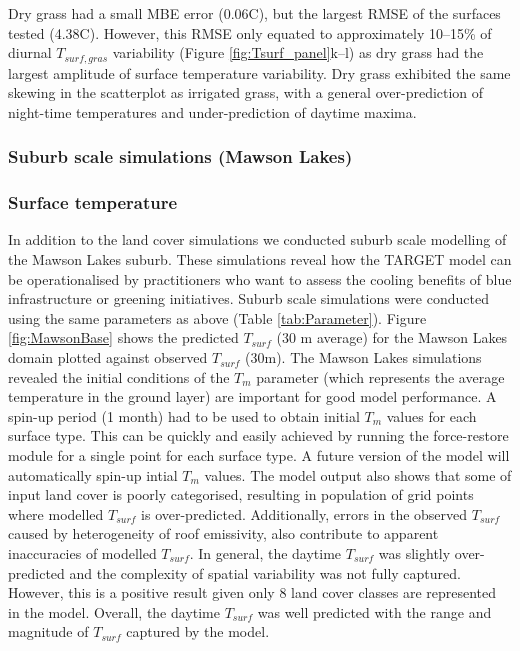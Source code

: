 \documentclass[gmd, manuscript]{copernicus}
\begin{document}
Dry grass had a small MBE error (0.06\degree C), but the largest RMSE of the surfaces tested (4.38\degree C). However, this RMSE only equated to approximately 10--15\% of diurnal $T_{surf,gras}$ variability (Figure \ref{fig:Tsurf_panel}k--l) as dry grass had the largest amplitude of surface temperature variability. Dry grass exhibited the same skewing in the scatterplot as irrigated grass, with a general over-prediction of night-time temperatures and under-prediction of daytime maxima. 





\subsubsection{Suburb scale simulations (Mawson Lakes)}\label{sec:suburbresult} 
\subsubsection*{Surface temperature}\label{sec:surftempresult} 



In addition to the land cover simulations we conducted suburb scale modelling of the Mawson Lakes suburb. These simulations reveal how the TARGET model can be operationalised by practitioners who want to assess the cooling benefits of blue infrastructure or greening initiatives. Suburb scale simulations were conducted using the same parameters as above (Table \ref{tab:Parameter}). Figure \ref{fig:MawsonBase} shows the predicted $T_{surf}$ (30 m average) for the Mawson Lakes domain plotted against observed $T_{surf}$ (30m). The Mawson Lakes simulations revealed the initial conditions of the \ensuremath{T_{m}} parameter (which represents the average temperature in the ground layer) are  important for good model performance. A spin-up period (1 month) had to be used to obtain initial \ensuremath{T_{m}} values for each surface type. This can be quickly and easily achieved by running the force-restore module for a single point for each surface type. A future version of the model will automatically spin-up intial \ensuremath{T_{m}} values. The model output also shows that some of input land cover is poorly categorised, resulting in population of grid points where modelled $T_{surf}$ is  over-predicted. Additionally, errors in the observed $T_{surf}$ caused by heterogeneity of roof emissivity,  also contribute to apparent inaccuracies of modelled $T_{surf}$. In general, the daytime $T_{surf}$ was slightly over-predicted and the complexity of spatial variability was not fully captured. However, this is a positive result given only 8 land cover classes are represented in the model. Overall, the daytime $T_{surf}$ was well predicted with the range and magnitude of $T_{surf}$ captured by the model. 
\end{document}
